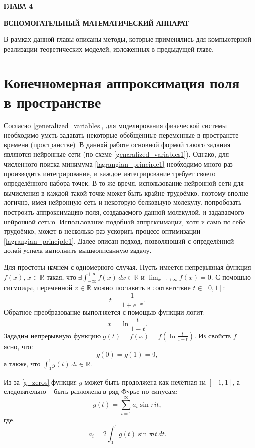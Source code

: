 \newpage
\begin{center}
	\textbf{\large ГЛАВА 4}

	\textbf{\large ВСПОМОГАТЕЛЬНЫЙ МАТЕМАТИЧЕСКИЙ АППАРАТ}
\end{center}

В рамках данной главы описаны методы, которые применялись для компьютерной реализации теоретических моделей, изложенных в предыдущей главе.

\section{Конечномерная аппроксимация поля в пространстве}
Согласно \ref{generalized_variables}, для моделирования физической системы необходимо уметь задавать некоторые обобщённые переменные в пространсте-времени (пространстве). В данной работе основной формой такого задания являются нейронные сети (по схеме \ref{generalized_variables1}). Однако, для численного поиска минимума \ref{lagrangian_principle1} необходимо много раз производить  интегрирование, и каждое интегрирование требует своего определённого набора точек. В то же время, использование нейронной сети для вычисления в каждой такой точке может быть крайне трудоёмко, поэтому вполне логично, имея нейронную сеть и некоторую белковыую молекулу, попробовать построить аппроксимацию поля, создаваемого данной молекулой, и задаваемого нейронной сетью. Использование подобной аппроксимации, хотя и само по себе трудоёмко, может в несколько раз ускорить процесс оптимизации \ref{lagrangian_principle1}. Далее описан подход, позволяющий с определённой долей успеха выполнить вышеописанную задачу. 

Для простоты начнём с одномерного случая. Пусть имеется непрерывная функция $f(x)$, $x \in \mathbb{R}$ такая, что $\exists \int_{-\infty}^{+\infty}f(x) \, dx \in \mathbb{R}$ и
$\lim_{x \to \pm\infty}f(x) = 0$. С помощью сигмоиды, переменной $x \in \mathbb{R}$ можно поставить в соответствие $t \in [0, 1]$:
\begin{equation}
	t = \frac{1}{1 + e^{-x}}.
	\label{t_and_x}
\end{equation}
Обратное преобразование выполняется с помощью функции логит:
\begin{equation}
	x = \ln\frac{t}{1-t}.
	\label{x_and_t}
\end{equation}
Зададим непрерывную функцию $g(t) = f(x) = f(\ln\frac{t}{1-t})$. Из свойств $f$ ясно, что:
\begin{equation}
	g(0) = g(1) = 0,
	\label{g_zeros}
\end{equation}
а также, что $\int_0^1g(t) \, dt \in \mathbb{R}$.

Из-за \ref{g_zeros} функция $g$ может быть продолжена как нечётная на $[-1, 1]$, а следовательно -- быть разложена в ряд Фурье по синусам:
\begin{equation}
	g(t) = \sum_{i=1}^\infty a_i\sin{\pi it},
	\label{fourier}
\end{equation}
где:
\begin{equation}
	a_i = 2\int_0^1g(t) \sin{\pi it} \, dt.
	\label{a_coef}
\end{equation}

